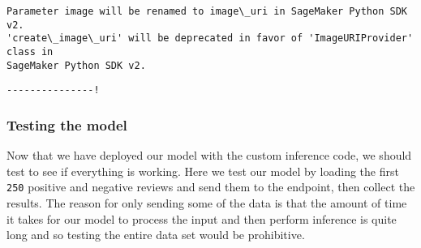 \documentclass[11pt]{article}
\begin{document}
    \begin{Verbatim}[commandchars=\\\{\}]
Parameter image will be renamed to image\_uri in SageMaker Python SDK v2.
'create\_image\_uri' will be deprecated in favor of 'ImageURIProvider' class in
SageMaker Python SDK v2.
    \end{Verbatim}

    \begin{Verbatim}[commandchars=\\\{\}]
---------------!
    \end{Verbatim}

    \hypertarget{testing-the-model}{%
\subsubsection{Testing the model}\label{testing-the-model}}

Now that we have deployed our model with the custom inference code, we
should test to see if everything is working. Here we test our model by
loading the first \texttt{250} positive and negative reviews and send
them to the endpoint, then collect the results. The reason for only
sending some of the data is that the amount of time it takes for our
model to process the input and then perform inference is quite long and
so testing the entire data set would be prohibitive.
\end{document}
